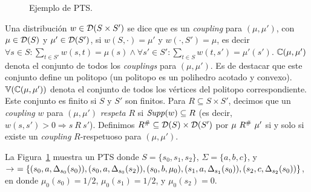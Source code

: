 \begin{figure}
\begin{center}
  \caption{Ejemplo de PTS.}
    \label{figure:pts1}
  \end{center}
  \end{figure}

Una distribución $w \in \mathcal{D}(S \times S')$ se dice que es un \textit{coupling} para $(\mu, \mu')$, con 
$\mu \in \mathcal{D}(S)$ y $\mu' \in \mathcal{D}(S')$, si $w(S, \cdot) = \mu'$ y 
$w(\cdot, S') = \mu$, es decir $\forall s \in S: \sum_{t \in S'} w(s,t) = \mu(s) \wedge \forall s' \in S':\sum_{t \in S} w(t,s') = \mu'(s')$. $\mathbb{C}(\mu,\mu')$ denota el conjunto de todos los \textit{couplings} para $(\mu, \mu')$.  Es de destacar que este conjunto define un politopo (un politopo es un polihedro acotado y convexo). $\mathbb{V}(\mathbb{C}(\mu,\mu'))$ denota el conjunto de todos los vértices del politopo correspondiente.
Este conjunto es finito si $S$ y $S'$ son finitos.
%
Para $R \subseteq S \times S'$, decimos que un \textit{coupling} $w$ para $(\mu, \mu')$ 
\textit{respeta} $R$ si $\mathit{Supp}(w) \subseteq R$ (es decir, $w(s, s') > 0 \Rightarrow s~R~s'$).
Definimos $R^{\#} \subseteq \mathcal{D}(S) \times \mathcal{D}(S')$ por $\mu~R^{\#}~\mu'$ si y solo si
existe un \textit{coupling} $R$-respetuoso para $(\mu, \mu')$.%

La Figura~\ref{figure:pts1} muestra un PTS donde $S = \{ s_0, s_1, s_2\}$, $\Sigma = \{a, b, c\}$, y $\rightarrow\ = \{ (s_0,a,\Delta_{s_0}(s_0)), (s_0,a,\Delta_{s_0}(s_2)), (s_0,b,\mu_0), (s_1,a,\Delta_{s_1}(s_0)), (s_2,c,\Delta_{s_2}(s_0)) \}$, en donde $\mu_0(s_0) = 1/2$, $\mu_0(s_1) = 1/2$, y $\mu_0(s_2) = 0$.

